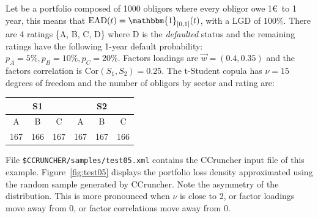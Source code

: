 \documentclass[11pt,fleqn]{book} %
\begin{document}
\begin{example}[2 factors]
	\label{ex:test05}
	Let be a portfolio composed of 1000 obligors where every obligor owe 1\euro\ to
	1 year, this means that $\text{EAD}(t) = \mathbbm{1}_{[0,1]}(t)$, with 
	a LGD of $100\%$. There are 4 ratings \{A, B, C, D\} where D is the 
	\emph{defaulted} status and the remaining ratings have the following 1-year 
	default probability: $p_A = 5\%, p_B = 10\%, p_C = 20\%$. Factors loadings 
	are $\vec{w} = (0.4, 0.35)$ and the factors correlation is 
	$\text{Cor}(S_1,S_2) = 0.25$. The t-Student copula has $\nu=15$ degrees
	of freedom and the number of obligors by sector and rating are:

	\hspace*{1cm}
	\begin{tabular}{|c|c|c||c|c|c|}
		\hline
		\multicolumn{3}{|c||}{S1} & \multicolumn{3}{|c|}{S2} \\
		\hline
		A & B & C & A & B & C \\
		\hline
		167 & 166 & 167 & 167 & 167 & 166 \\
		\hline
	\end{tabular}
	

	File \texttt{\$CCRUNCHER/samples/test05.xml} contains the CCruncher input
	file of this example. Figure~\ref{fig:test05} displays the portfolio
	loss density approximated using the random sample generated by CCruncher.
	Note the asymmetry of the distribution. This is more pronounced when 
	$\nu$ is close to $2$, or factor loadings move away from $0$, or factor 
	correlations move away from $0$.


\end{example}
\end{document}
